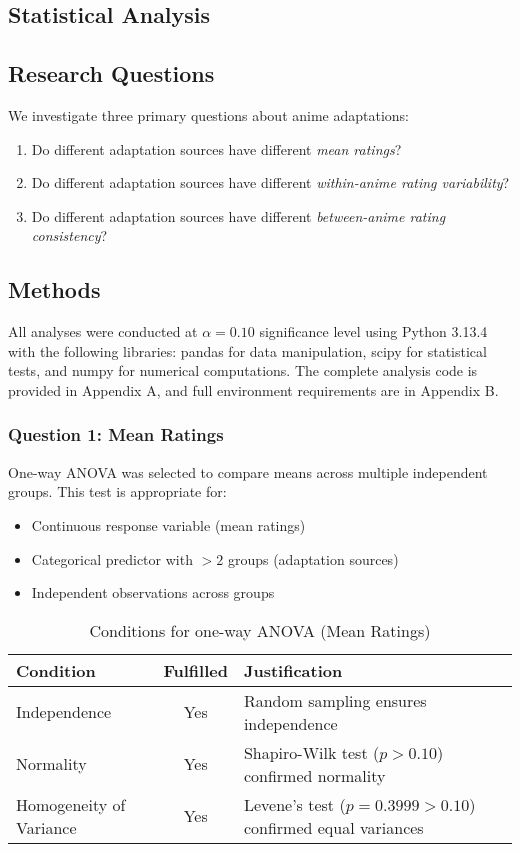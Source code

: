 \documentclass{article}
\begin{document}
\begin{CJK*}{UTF8}{gbsn}
\section{Statistical Analysis}

\subsection{Research Questions}
We investigate three primary questions about anime adaptations:
\begin{enumerate}
    \item Do different adaptation sources have different \textit{mean ratings}? 
    \item Do different adaptation sources have different \textit{within-anime rating variability}? 
    \item Do different adaptation sources have different \textit{between-anime rating consistency}? 
\end{enumerate}

\subsection{Methods}
All analyses were conducted at $\alpha = 0.10$ significance level using Python 3.13.4 with the following libraries: pandas for data manipulation, scipy for statistical tests, and numpy for numerical computations. The complete analysis code is provided in Appendix A, and full environment requirements are in Appendix B.

\subsubsection{Question 1: Mean Ratings}
One-way ANOVA was selected to compare means across multiple independent groups. This test is appropriate for:
\begin{itemize}
    \item Continuous response variable (mean ratings)
    \item Categorical predictor with $>2$ groups (adaptation sources)
    \item Independent observations across groups
\end{itemize}

\begin{table}[H]
\centering
\caption{Conditions for one-way ANOVA (Mean Ratings)}
\begin{tabular}{lcp{9cm}}
\toprule
\textbf{Condition} & \textbf{Fulfilled} & \textbf{Justification} \\
\midrule
Independence & Yes & Random sampling ensures independence \\
Normality & Yes & Shapiro-Wilk test ($p > 0.10$) confirmed normality \\
Homogeneity of Variance & Yes & Levene's test ($p = 0.3999 > 0.10$) confirmed equal variances \\
\bottomrule
\end{tabular}
\end{table}


\end{CJK*}
\end{document}
